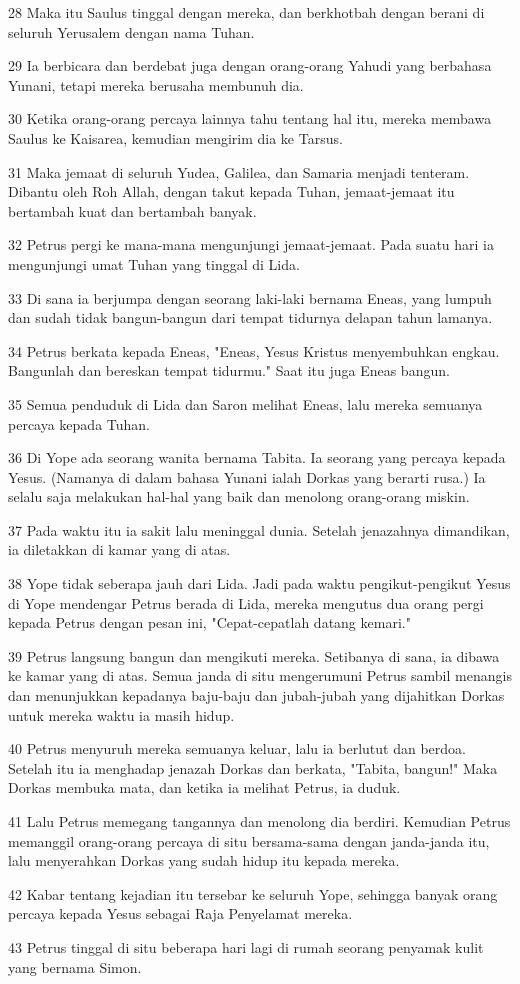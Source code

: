 \par 28 Maka itu Saulus tinggal dengan mereka, dan berkhotbah dengan berani di seluruh Yerusalem dengan nama Tuhan.
\par 29 Ia berbicara dan berdebat juga dengan orang-orang Yahudi yang berbahasa Yunani, tetapi mereka berusaha membunuh dia.
\par 30 Ketika orang-orang percaya lainnya tahu tentang hal itu, mereka membawa Saulus ke Kaisarea, kemudian mengirim dia ke Tarsus.
\par 31 Maka jemaat di seluruh Yudea, Galilea, dan Samaria menjadi tenteram. Dibantu oleh Roh Allah, dengan takut kepada Tuhan, jemaat-jemaat itu bertambah kuat dan bertambah banyak.
\par 32 Petrus pergi ke mana-mana mengunjungi jemaat-jemaat. Pada suatu hari ia mengunjungi umat Tuhan yang tinggal di Lida.
\par 33 Di sana ia berjumpa dengan seorang laki-laki bernama Eneas, yang lumpuh dan sudah tidak bangun-bangun dari tempat tidurnya delapan tahun lamanya.
\par 34 Petrus berkata kepada Eneas, "Eneas, Yesus Kristus menyembuhkan engkau. Bangunlah dan bereskan tempat tidurmu." Saat itu juga Eneas bangun.
\par 35 Semua penduduk di Lida dan Saron melihat Eneas, lalu mereka semuanya percaya kepada Tuhan.
\par 36 Di Yope ada seorang wanita bernama Tabita. Ia seorang yang percaya kepada Yesus. (Namanya di dalam bahasa Yunani ialah Dorkas yang berarti rusa.) Ia selalu saja melakukan hal-hal yang baik dan menolong orang-orang miskin.
\par 37 Pada waktu itu ia sakit lalu meninggal dunia. Setelah jenazahnya dimandikan, ia diletakkan di kamar yang di atas.
\par 38 Yope tidak seberapa jauh dari Lida. Jadi pada waktu pengikut-pengikut Yesus di Yope mendengar Petrus berada di Lida, mereka mengutus dua orang pergi kepada Petrus dengan pesan ini, "Cepat-cepatlah datang kemari."
\par 39 Petrus langsung bangun dan mengikuti mereka. Setibanya di sana, ia dibawa ke kamar yang di atas. Semua janda di situ mengerumuni Petrus sambil menangis dan menunjukkan kepadanya baju-baju dan jubah-jubah yang dijahitkan Dorkas untuk mereka waktu ia masih hidup.
\par 40 Petrus menyuruh mereka semuanya keluar, lalu ia berlutut dan berdoa. Setelah itu ia menghadap jenazah Dorkas dan berkata, "Tabita, bangun!" Maka Dorkas membuka mata, dan ketika ia melihat Petrus, ia duduk.
\par 41 Lalu Petrus memegang tangannya dan menolong dia berdiri. Kemudian Petrus memanggil orang-orang percaya di situ bersama-sama dengan janda-janda itu, lalu menyerahkan Dorkas yang sudah hidup itu kepada mereka.
\par 42 Kabar tentang kejadian itu tersebar ke seluruh Yope, sehingga banyak orang percaya kepada Yesus sebagai Raja Penyelamat mereka.
\par 43 Petrus tinggal di situ beberapa hari lagi di rumah seorang penyamak kulit yang bernama Simon.

